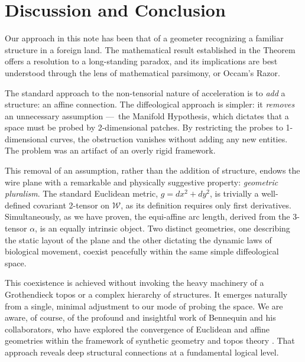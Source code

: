\documentclass[10pt,letterpaper,reqno]{amsart}
\newcommand{\cW}{\mathcal{W}}
\begin{document}
  \section{Discussion and Conclusion}
  
  Our approach in this note has been that of a geometer recognizing a familiar structure in a foreign land.
  The mathematical result established in the Theorem offers a resolution to a long-standing paradox,
  and its implications are best understood through the lens of mathematical parsimony, or Occam's Razor.
  
  The standard approach to the non-tensorial nature of acceleration is to \emph{add} a structure:
  an affine connection.
  The diffeological approach is simpler: it \emph{removes} an unnecessary assumption
  ---~the Manifold Hypothesis,
  which dictates that a space must be probed by 2-dimensional patches.
  By restricting the probes to 1-dimensional curves,
  the obstruction vanishes without adding any new entities.
  The problem was an artifact of an overly rigid framework.
  
  This removal of an assumption, rather than the addition of structure,
  endows the wire plane with a remarkable and physically suggestive property:
  \emph{geometric pluralism}.
  The standard Euclidean metric, $g = dx^2 + dy^2$,
  is trivially a well-defined covariant 2-tensor on $\cW$,
  as its definition requires only first derivatives.
  Simultaneously,
  as we have proven,
  the equi-affine arc length,
  derived from the 3-tensor $\alpha$,
  is an equally intrinsic object.
  Two distinct geometries,
  one describing the static layout of the plane and the other dictating the dynamic laws of biological movement,
  coexist peacefully within the same simple diffeological space.
  
  This coexistence is achieved without invoking the heavy machinery of a Grothendieck topos
  or a complex hierarchy of structures.
  It emerges naturally from a single,
  minimal adjustment to our mode of probing the space.
  We are aware, of course,
  of the profound and insightful work of Bennequin and his collaborators,
  who have explored the convergence of Euclidean and affine geometries
  within the framework of synthetic geometry and topos theory \cite{BFBF09}.
  That approach reveals deep structural connections at a fundamental logical level.
  
\end{document}
